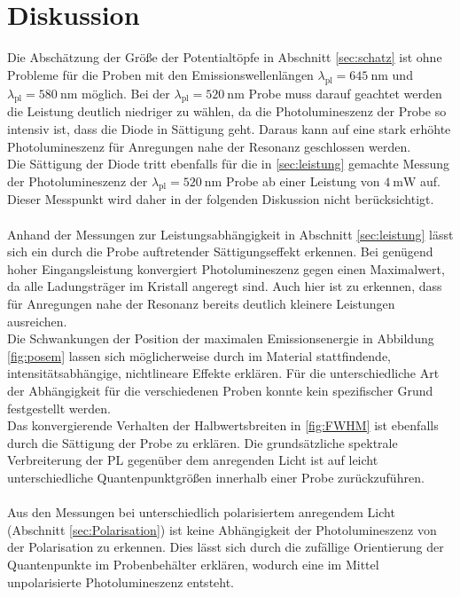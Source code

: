 \section{Diskussion}
Die Abschätzung der Größe der Potentialtöpfe in Abschnitt \ref{sec:schatz} ist ohne Probleme für die Proben mit den Emissionswellenlängen $\lambda_{\text{pl}} = \SI{645}{\nano\meter}$ und $\lambda_{\text{pl}} = \SI{580}{\nano\meter}$ möglich. Bei der $\lambda_{\text{pl}} = \SI{520}{\nano\meter}$ Probe muss darauf geachtet werden die Leistung deutlich niedriger zu wählen, da die Photolumineszenz der Probe so intensiv ist, dass die Diode in Sättigung geht. Daraus kann auf eine stark erhöhte Photolumineszenz für Anregungen nahe der Resonanz geschlossen werden.\\
Die Sättigung der Diode tritt ebenfalls für die in \ref{sec:leistung} gemachte Messung der Photolumineszenz der $\lambda_{\text{pl}} = \SI{520}{\nano\meter}$ Probe ab einer Leistung von $\SI{4}{\milli\watt}$ auf. Dieser Messpunkt wird daher in der folgenden Diskussion nicht berücksichtigt.\\
\\
Anhand der Messungen zur Leistungsabhängigkeit in Abschnitt \ref{sec:leistung} lässt sich ein durch die Probe auftretender Sättigungseffekt erkennen. Bei genügend hoher Eingangsleistung konvergiert Photolumineszenz gegen einen Maximalwert, da alle Ladungsträger im Kristall angeregt sind. Auch hier ist zu erkennen, dass für Anregungen nahe der Resonanz bereits deutlich kleinere Leistungen ausreichen.\\
Die Schwankungen der Position der maximalen Emissionsenergie in Abbildung \ref{fig:posem} lassen sich möglicherweise durch im Material stattfindende, intensitätsabhängige, nichtlineare Effekte erklären. Für die unterschiedliche Art der Abhängigkeit für die verschiedenen Proben konnte kein spezifischer Grund festgestellt werden.\\
Das konvergierende Verhalten der Halbwertsbreiten in \ref{fig:FWHM} ist ebenfalls durch die Sättigung der Probe zu erklären. Die grundsätzliche spektrale Verbreiterung der PL gegenüber dem anregenden Licht ist auf leicht unterschiedliche Quantenpunktgrößen innerhalb einer Probe zurückzuführen.\\
\\
Aus den Messungen bei unterschiedlich polarisiertem anregendem Licht (Abschnitt \ref{sec:Polarisation}) ist keine Abhängigkeit der Photolumineszenz von der Polarisation zu erkennen. Dies lässt sich durch die zufällige Orientierung der Quantenpunkte im Probenbehälter erklären, wodurch eine im Mittel unpolarisierte Photolumineszenz entsteht.\\
